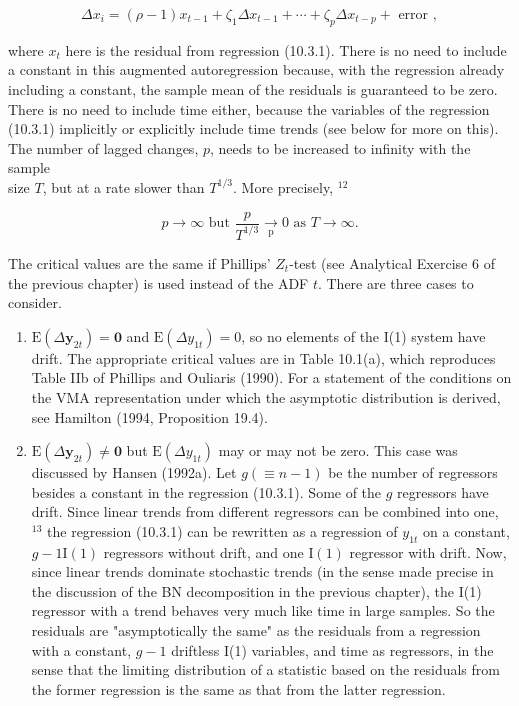 \documentclass[10pt]{article}
\begin{document}
\begin{equation*}
\Delta x_{i}=(\rho-1) x_{t-1}+\zeta_{1} \Delta x_{t-1}+\cdots+\zeta_{p} \Delta x_{t-p}+\text { error }, \tag{10.3.2}
\end{equation*}


where $x_{t}$ here is the residual from regression (10.3.1). There is no need to include a constant in this augmented autoregression because, with the regression already including a constant, the sample mean of the residuals is guaranteed to be zero. There is no need to include time either, because the variables of the regression (10.3.1) implicitly or explicitly include time trends (see below for more on this). The number of lagged changes, $p$, needs to be increased to infinity with the sample\\
size $T$, but at a rate slower than $T^{1 / 3}$. More precisely, ${ }^{12}$


\begin{equation*}
p \rightarrow \infty \text { but } \frac{p}{T^{1 / 3}} \underset{\mathrm{p}}{\rightarrow} 0 \text { as } T \rightarrow \infty . \tag{10.3.3}
\end{equation*}


The critical values are the same if Phillips' $Z_{t}$-test (see Analytical Exercise 6 of the previous chapter) is used instead of the ADF $t$. There are three cases to consider.

\begin{enumerate}
  \item $\mathrm{E}\left(\Delta \mathbf{y}_{2 t}\right)=\mathbf{0}$ and $\mathrm{E}\left(\Delta y_{1 t}\right)=0$, so no elements of the I(1) system have drift. The appropriate critical values are in Table 10.1(a), which reproduces Table IIb of Phillips and Ouliaris (1990). For a statement of the conditions on the VMA representation under which the asymptotic distribution is derived, see Hamilton (1994, Proposition 19.4).
  \item $\mathrm{E}\left(\Delta \mathbf{y}_{2 t}\right) \neq \mathbf{0}$ but $\mathrm{E}\left(\Delta y_{1 t}\right)$ may or may not be zero. This case was discussed by Hansen (1992a). Let $g(\equiv n-1)$ be the number of regressors besides a constant in the regression (10.3.1). Some of the $g$ regressors have drift. Since linear trends from different regressors can be combined into one, ${ }^{13}$ the regression (10.3.1) can be rewritten as a regression of $y_{1 t}$ on a constant, $g-1 \mathrm{I}(1)$ regressors without drift, and one $\mathrm{I}(1)$ regressor with drift. Now, since linear trends dominate stochastic trends (in the sense made precise in the discussion of the BN decomposition in the previous chapter), the I(1) regressor with a trend behaves very much like time in large samples. So the residuals are "asymptotically the same" as the residuals from a regression with a constant, $g-1$ driftless I(1) variables, and time as regressors, in the sense that the limiting distribution of a statistic based on the residuals from the former regression is the same as that from the latter regression.
\end{enumerate}
\end{document}
